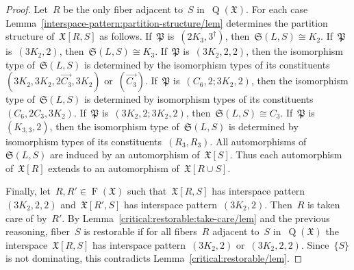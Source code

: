 \documentclass[english,a4paper]{article}
\theoremstyle{plain}
\theoremstyle{definition}
\DeclareMathOperator{\Fibers}{F}
\newcommand{\coherentConfig}{\ensuremath{\mathfrak{X}}}
\newcommand{\fibers}[1]{\ensuremath{\Fibers \left( #1 \right)}}
\newcommand{\interspace}[2]{\ensuremath{\coherentConfig[#1,#2]}}
\newcommand{\inducedCC}[1]{\ensuremath{\coherentConfig[#1]}}
\DeclareMathOperator*{\Quotient}{Q}
\newcommand{\quotientGraph}[1]{\ensuremath{\Quotient(#1)}}
\newcommand{\partitionStructure}[1]{\ensuremath{\mathfrak{S}(#1)}}
\newcommand{\ipsixMatching}             {\ensuremath{(\disjointCliques{3}{2},2)}}
\newcommand{\ipsixMatchingTwice}        {\ensuremath{(\disjointCliques{3}{2},2,2)}}
\newcommand{\ipsixMatchingMatching}     {\ensuremath{(\disjointCliques{3}{2},2;\disjointCliques{3}{2},2)}}
\newcommand{\ipsixMatchingAndCycle}     {\ensuremath{(\cycle{6},2;\disjointCliques{3}{2},2)}}
\newcommand{\ipsixTriangle}               {\ensuremath{(\disjointCliques{2}{3},3^\dag)}}
\newcommand{\ipsixTriangleComplement}     {\ensuremath{(\clique{3,3},2)}}
\newcommand{\clique}[1]{\ensuremath{K_{#1}}}
\newcommand{\cycle}[1]{\ensuremath{C_{#1}}}
\newcommand{\disjointCliques}[2]{\ensuremath{#1 \clique{#2}}}
\newcommand{\rookGraph}[1]{\ensuremath{R_{#1}}}
\begin{document}
\begin{proof}
    Let~$R$ be the only fiber adjacent to~$S$ in~$\quotientGraph{\coherentConfig}$.
    For each case Lemma~\ref{interspace-pattern:partition-structure/lem} determines the partition structure of~$\interspace{R}{S}$ as follows.
    If~$\mathfrak{P}$ is~$\ipsixTriangle$, then~$\partitionStructure{L,S} \cong K_2$.
    If~$\mathfrak{P}$ is~$\ipsixMatching$, then~$\partitionStructure{L,S} \cong K_3$.
    If~$\mathfrak{P}$ is~$\ipsixMatchingTwice$, then the isomorphism type of~$\partitionStructure{L,S}$ is determined by the isomorphism types of its constituents~$(3K_2,3K_2,2\overrightarrow{C_3},3K_2)$ or~$(\overrightarrow{C_3})$.
    If~$\mathfrak{P}$ is~$\ipsixMatchingAndCycle$, then the isomorphism type of~$\partitionStructure{L,S}$ is determined by isomorphism types of its constituents~$(C_6,2C_3,3K_2)$.
    If~$\mathfrak{P}$ is~$\ipsixMatchingMatching$, then~$\partitionStructure{L,S} \cong C_3$.
    If~$\mathfrak{P}$ is~$\ipsixTriangleComplement$, then the isomorphism type of~$\partitionStructure{L,S}$ is determined by isomorphism types of its constituents~$(\rookGraph{3},\rookGraph{3})$.
    All automorphisms of~$\partitionStructure{L,S}$ are induced by an automorphism of~$\inducedCC{S}$.
    Thus each automorphism of~$\inducedCC{R}$ extends to an automorphism of~$\inducedCC{R \cup S}$.

    Finally, let~$R,R' \in \fibers{\coherentConfig}$ such that~$\interspace{R}{S}$ has interspace pattern~$\ipsixMatchingTwice$ and~$\interspace{R'}{S}$ has interspace pattern~$\ipsixMatching$.
    Then~$R$ is taken care of by~$R'$.
    By Lemma~\ref{critical:restorable:take-care/lem} and the previous reasoning, fiber~$S$ is restorable if for all fibers~$R$ adjacent to~$S$ in~$\quotientGraph{\coherentConfig}$ the interspace~$\interspace{R}{S}$ has interspace pattern~$\ipsixMatching$ or~$\ipsixMatchingTwice$.
    Since~$\{S\}$ is not dominating, this contradicts Lemma~\ref{critical:restorable/lem}.
\end{proof}
\end{document}
